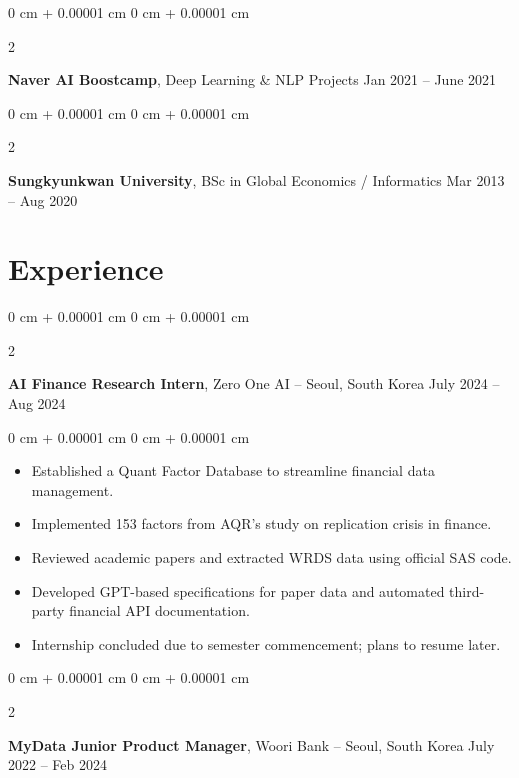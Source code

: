 \documentclass[10pt, letterpaper]{article}
\newenvironment{highlights}{
    \begin{itemize}[
        topsep=0.10 cm,
        parsep=0.10 cm,
        partopsep=0pt,
        itemsep=0pt,
        leftmargin=0 cm + 10pt
    ]
}{
    \end{itemize}
} %
\newenvironment{onecolentry}{
    \begin{adjustwidth}{
        0 cm + 0.00001 cm
    }{
        0 cm + 0.00001 cm
    }
}{
    \end{adjustwidth}
} %
\newenvironment{twocolentry}[2][]{
    \onecolentry
    \def\secondColumn{#2}
    \setcolumnwidth{\fill, 4.5 cm}
    \begin{paracol}{2}
}{
    \switchcolumn \raggedleft \secondColumn
    \end{paracol}
    \endonecolentry
} %
\begin{document}
        \begin{twocolentry}{
            Jan 2021 – June 2021
        }
            \textbf{Naver AI Boostcamp}, Deep Learning \& NLP Projects\end{twocolentry}



        \vspace{0.2 cm}

        \begin{twocolentry}{
            Mar 2013 – Aug 2020
        }
            \textbf{Sungkyunkwan University}, BSc in Global Economics / Informatics\end{twocolentry}




    
    \section{Experience}



        
        \begin{twocolentry}{
            July 2024 – Aug 2024
        }
            \textbf{AI Finance Research Intern}, Zero One AI -- Seoul, South Korea\end{twocolentry}

        \vspace{0.10 cm}
        \begin{onecolentry}
            \begin{highlights}
                \item Established a Quant Factor Database to streamline financial data management.
                \item Implemented 153 factors from AQR's study on replication crisis in finance.
                \item Reviewed academic papers and extracted WRDS data using official SAS code.
                \item Developed GPT-based specifications for paper data and automated third-party financial API documentation.
                \item Internship concluded due to semester commencement; plans to resume later.
            \end{highlights}
        \end{onecolentry}


        \vspace{0.2 cm}

        \begin{twocolentry}{
            July 2022 – Feb 2024
        }
            \textbf{MyData Junior Product Manager}, Woori Bank -- Seoul, South Korea\end{twocolentry}
\end{document}

